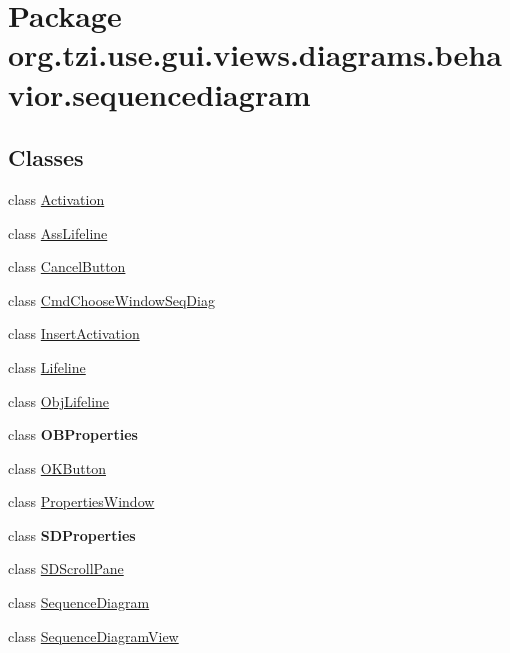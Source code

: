 \hypertarget{namespaceorg_1_1tzi_1_1use_1_1gui_1_1views_1_1diagrams_1_1behavior_1_1sequencediagram}{\section{Package org.\-tzi.\-use.\-gui.\-views.\-diagrams.\-behavior.\-sequencediagram}
\label{namespaceorg_1_1tzi_1_1use_1_1gui_1_1views_1_1diagrams_1_1behavior_1_1sequencediagram}
}
\subsection*{Classes}
\begin{DoxyCompactItemize}
\item 
class \hyperlink{classorg_1_1tzi_1_1use_1_1gui_1_1views_1_1diagrams_1_1behavior_1_1sequencediagram_1_1_activation}{Activation}
\item 
class \hyperlink{classorg_1_1tzi_1_1use_1_1gui_1_1views_1_1diagrams_1_1behavior_1_1sequencediagram_1_1_ass_lifeline}{Ass\-Lifeline}
\item 
class \hyperlink{classorg_1_1tzi_1_1use_1_1gui_1_1views_1_1diagrams_1_1behavior_1_1sequencediagram_1_1_cancel_button}{Cancel\-Button}
\item 
class \hyperlink{classorg_1_1tzi_1_1use_1_1gui_1_1views_1_1diagrams_1_1behavior_1_1sequencediagram_1_1_cmd_choose_window_seq_diag}{Cmd\-Choose\-Window\-Seq\-Diag}
\item 
class \hyperlink{classorg_1_1tzi_1_1use_1_1gui_1_1views_1_1diagrams_1_1behavior_1_1sequencediagram_1_1_insert_activation}{Insert\-Activation}
\item 
class \hyperlink{classorg_1_1tzi_1_1use_1_1gui_1_1views_1_1diagrams_1_1behavior_1_1sequencediagram_1_1_lifeline}{Lifeline}
\item 
class \hyperlink{classorg_1_1tzi_1_1use_1_1gui_1_1views_1_1diagrams_1_1behavior_1_1sequencediagram_1_1_obj_lifeline}{Obj\-Lifeline}
\item 
class {\bfseries O\-B\-Properties}
\item 
class \hyperlink{classorg_1_1tzi_1_1use_1_1gui_1_1views_1_1diagrams_1_1behavior_1_1sequencediagram_1_1_o_k_button}{O\-K\-Button}
\item 
class \hyperlink{classorg_1_1tzi_1_1use_1_1gui_1_1views_1_1diagrams_1_1behavior_1_1sequencediagram_1_1_properties_window}{Properties\-Window}
\item 
class {\bfseries S\-D\-Properties}
\item 
class \hyperlink{classorg_1_1tzi_1_1use_1_1gui_1_1views_1_1diagrams_1_1behavior_1_1sequencediagram_1_1_s_d_scroll_pane}{S\-D\-Scroll\-Pane}
\item 
class \hyperlink{classorg_1_1tzi_1_1use_1_1gui_1_1views_1_1diagrams_1_1behavior_1_1sequencediagram_1_1_sequence_diagram}{Sequence\-Diagram}
\item 
class \hyperlink{classorg_1_1tzi_1_1use_1_1gui_1_1views_1_1diagrams_1_1behavior_1_1sequencediagram_1_1_sequence_diagram_view}{Sequence\-Diagram\-View}
\end{DoxyCompactItemize}
